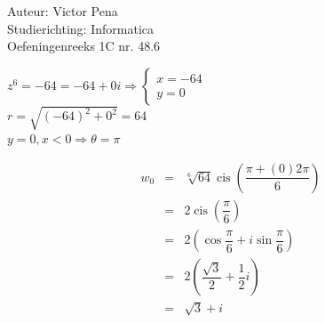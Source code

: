 \documentclass[a4paper]{article}
\DeclareMathOperator{\cis}{cis}
\begin{document}
\noindent \large Auteur: Victor Pena \\
\noindent \large Studierichting: Informatica\\
\noindent \large Oefeningenreeks 1C nr. 48.6\\

\medskip

\normalsize 
$z^6 = -64 = -64 + 0i \Rightarrow
 \left\{
\begin{array}{l}
x=-64\\
y = 0
\end{array}
\right .$\\

$r = \sqrt{(-64)^2 + 0^2} = 64$ \\

$y=0, x<0 \Rightarrow \theta = \pi$

\begin{eqnarray*}
w_0 & = & \sqrt[6]{64}\cis\left(\dfrac{\pi + (0)2\pi}{6}\right) \\
& = & 2\cis\left(\dfrac{\pi}{6}\right) \\
& = & 2\left(\cos\dfrac{\pi}{6} + i\sin\dfrac{\pi}{6}\right) \\
& = & 2\left(\dfrac{\sqrt{3}}{2} + \dfrac{1}{2}i\right) \\
& = & \sqrt{3} + i
\end{eqnarray*}
\end{document}
